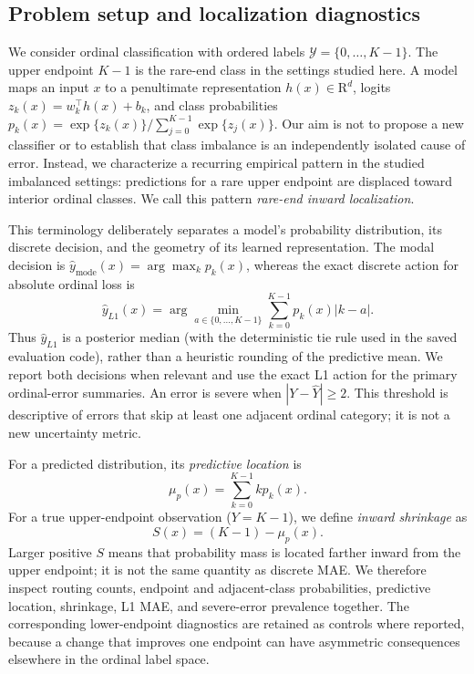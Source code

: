 \subsection{Problem setup and localization diagnostics}

We consider ordinal classification with ordered labels
\(\mathcal{Y}=\{0,\ldots,K-1\}\). The upper endpoint \(K-1\) is the
rare-end class in the settings studied here. A model maps an input \(x\) to a
penultimate representation \(h(x)\in\mathrm{R}^d\), logits
\(z_k(x)=w_k^\top h(x)+b_k\), and class probabilities
\(p_k(x)=\exp\{z_k(x)\}/\sum_{j=0}^{K-1}\exp\{z_j(x)\}\). Our aim is not to
propose a new classifier or to establish that class imbalance is an
independently isolated cause of error. Instead, we characterize a recurring
empirical pattern in the studied imbalanced settings: predictions for a rare
upper endpoint are displaced toward interior ordinal classes. We call this
pattern \emph{rare-end inward localization}.

This terminology deliberately separates a model's probability distribution,
its discrete decision, and the geometry of its learned representation. The
modal decision is \(\hat y_{\mathrm{mode}}(x)=\arg\max_k p_k(x)\), whereas the
exact discrete action for absolute ordinal loss is
\[
\hat y_{L1}(x)=\arg\min_{a\in\{0,\ldots,K-1\}}
    \sum_{k=0}^{K-1}p_k(x)|k-a|.
\]
Thus \(\hat y_{L1}\) is a posterior median (with the deterministic tie rule
used in the saved evaluation code), rather than a heuristic rounding of the
predictive mean. We report both decisions when relevant and use the exact L1
action for the primary ordinal-error summaries. An error is severe when
\( |Y-\hat Y|\geq 2 \). This threshold is descriptive of errors that skip at
least one adjacent ordinal category; it is not a new uncertainty metric.

For a predicted distribution, its \emph{predictive location} is
\[\mu_p(x)=\sum_{k=0}^{K-1} k p_k(x).\]
For a true upper-endpoint observation (\(Y=K-1\)), we define \emph{inward
shrinkage} as \[S(x)=(K-1)-\mu_p(x).\]
Larger positive \(S\) means that probability mass is located farther inward
from the upper endpoint; it is not the same quantity as discrete MAE. We
therefore inspect routing counts, endpoint and adjacent-class probabilities,
predictive location, shrinkage, L1 MAE, and severe-error prevalence together.
The corresponding lower-endpoint diagnostics are retained as controls where
reported, because a change that improves one endpoint can have asymmetric
consequences elsewhere in the ordinal label space.

